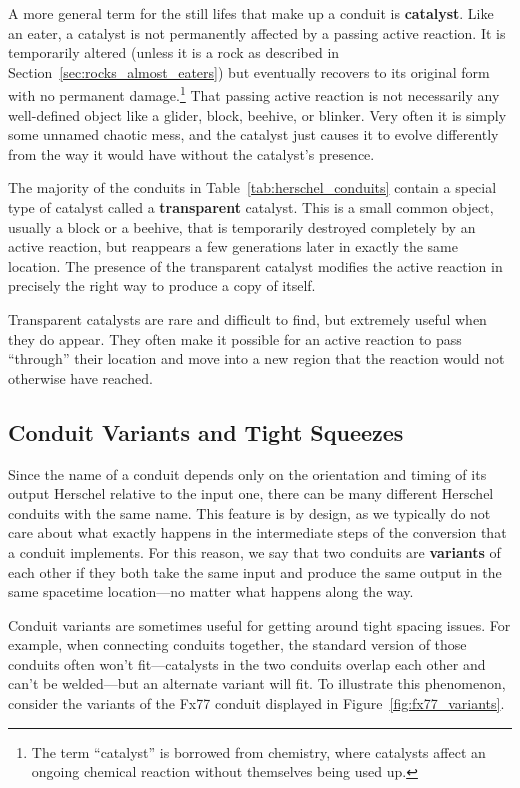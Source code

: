 A more general term for the still lifes that make up a conduit is \textbf{catalyst}. Like an eater, a catalyst is not permanently affected by a passing active reaction. It is temporarily altered (unless it is a rock as described in Section~\ref{sec:rocks_almost_eaters}) but eventually recovers to its original form with no permanent damage.\footnote{The term ``catalyst'' is borrowed from chemistry, where catalysts affect an ongoing chemical reaction without themselves being used up.} That passing active reaction is not necessarily any well-defined object like a glider, block, beehive, or blinker. Very often it is simply some unnamed chaotic mess, and the catalyst just causes it to evolve differently from the way it would have without the catalyst's presence.

The majority of the conduits in Table~\ref{tab:herschel_conduits} contain a special type of catalyst called a \textbf{transparent} catalyst. This is a small common object, usually a block or a beehive, that is temporarily destroyed completely by an active reaction, but reappears a few generations later in exactly the same location. The presence of the transparent catalyst modifies the active reaction in precisely the right way to produce a copy of itself.

Transparent catalysts are rare and difficult to find, but extremely useful when they do appear. They often make it possible for an active reaction to pass ``through'' their location and move into a new region that the reaction would not otherwise have reached.


\subsection{Conduit Variants and Tight Squeezes}

Since the name of a conduit depends only on the orientation and timing of its output Herschel relative to the input one, there can be many different Herschel conduits with the same name. This feature is by design, as we typically do not care about what exactly happens in the intermediate steps of the conversion that a conduit implements. For this reason, we say that two conduits are \textbf{variants} of each other if they both take the same input and produce the same output in the same spacetime location---no matter what happens along the way.

Conduit variants are sometimes useful for getting around tight spacing issues. For example, when connecting conduits together, the standard version of those conduits often won't fit---catalysts in the two conduits overlap each other and can't be welded---but an alternate variant will fit. To illustrate this phenomenon, consider the variants of the Fx77 conduit displayed in Figure~\ref{fig:fx77_variants}.

